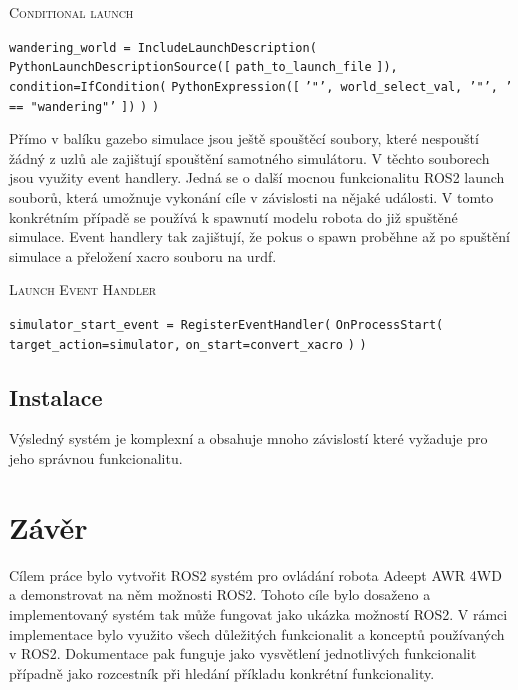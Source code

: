 \begin{algorithm}[h!]
	\label{}
	\caption{\textsc{Conditional launch}}
	
	\DontPrintSemicolon
	\SetAlgoNoLine
	\SetNlSty{}{}{:}
	\SetNlSkip{-1.1em}
	
	\BlankLine \Indp\Indpp
	
	\texttt{wandering\_world = IncludeLaunchDescription(}\;
	\Indp\Indp
	\texttt{PythonLaunchDescriptionSource([}\;
	\Indp\Indp
	\texttt{path\_to\_launch\_file}\;
	\Indm\Indm
	\texttt{]),}\;
	\texttt{condition=IfCondition(}\;
	\Indp\Indp
	\texttt{PythonExpression([}\;
	\Indp\Indp
	\texttt{'"', world\_select\_val, '"', ' == "wandering"'}\;
	\Indm\Indm
	\texttt{])}\;
	\Indm\Indm
	\texttt{)}\;
	\Indm\Indm
	\texttt{)}\;
	
\end{algorithm}




Přímo v balíku gazebo simulace jsou ještě spouštěcí soubory, které nespouští žádný z uzlů ale zajištují spouštění samotného simulátoru. V těchto souborech jsou využity event handlery. Jedná se o další mocnou funkcionalitu ROS2 launch souborů, která umožnuje vykonání cíle v závislosti na nějaké události. V tomto konkrétním případě se používá k spawnutí modelu robota do již spuštěné simulace. Event handlery tak zajištují, že pokus o spawn proběhne až po spuštění simulace a přeložení xacro souboru na urdf.

\begin{algorithm}[h!]
	\label{}
	\caption{\textsc{Launch Event Handler}}
	
	\DontPrintSemicolon
	\SetAlgoNoLine
	\SetAlgoNlRelativeSize{-1}
	\SetNlSty{}{}{:}
	\SetNlSkip{-1.1em}
	
	\BlankLine \Indp\Indpp
	
	\texttt{simulator\_start\_event = RegisterEventHandler(}\;
	\Indp\Indp
	\texttt{OnProcessStart(}\;
	\Indp\Indp
	\texttt{target\_action=simulator,}\;
	\texttt{on\_start=convert\_xacro}\;
	\Indm\Indm
	\texttt{)}\;
	\Indm\Indm
	\texttt{)}\;
	
\end{algorithm}

\section{Instalace}
Výsledný systém je komplexní a obsahuje mnoho závislostí které vyžaduje pro jeho správnou funkcionalitu.

\chapter{Závěr}
Cílem práce bylo vytvořit ROS2 systém pro ovládání robota Adeept AWR 4WD a demonstrovat na něm možnosti ROS2. Tohoto cíle bylo dosaženo a implementovaný systém tak může fungovat jako ukázka možností ROS2. V rámci implementace bylo využito všech důležitých funkcionalit a konceptů používaných v ROS2. Dokumentace pak funguje jako vysvětlení jednotlivých funkcionalit případně jako rozcestník při hledání příkladu konkrétní funkcionality.

